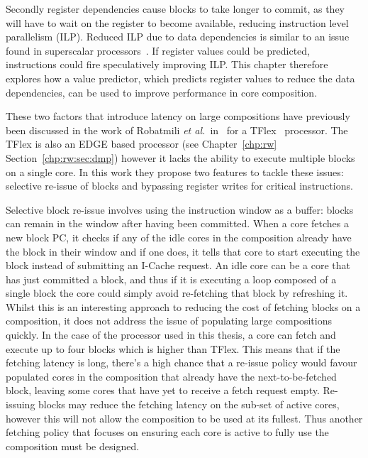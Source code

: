 Secondly register dependencies cause blocks to take longer to commit, as they will have to wait on the register to become available, reducing instruction level parallelism (ILP).
Reduced ILP due to data dependencies is similar to an issue found in superscalar processors~\cite{peraisBeBop2015}.
If register values could be predicted, instructions could fire speculatively improving ILP.
This chapter therefore explores how a value predictor, which predicts register values to reduce the data dependencies, can be used to improve performance in core composition.

These two factors that introduce latency on large compositions have previously been discussed in the work of Robatmili {\it et al.~}in~\cite{robatmili2011uniproc} for a TFlex~\cite{kim2007tflex} processor.
The TFlex is also an EDGE based processor (see Chapter~\ref{chp:rw} Section~\ref{chp:rw:sec:dmp}) however it lacks the ability to execute multiple blocks on a single core.
In this work they propose two features to tackle these issues: selective re-issue of blocks and bypassing register writes for critical instructions.

Selective block re-issue involves using the instruction window as a buffer: blocks can remain in the window after having been committed.
When a core fetches a new block PC, it checks if any of the idle cores in the composition already have the block in their window and if one does, it tells that core to start executing the block instead of submitting an I-Cache request.
An idle core can be a core that has just committed a block, and thus if it is executing a loop composed of a single block the core could simply avoid re-fetching that block by refreshing it.
Whilst this is an interesting approach to reducing the cost of fetching blocks on a composition, it does not address the issue of populating large compositions quickly.
In the case of the processor used in this thesis, a core can fetch and execute up to four blocks which is higher than TFlex.
This means that if the fetching latency is long, there's a high chance that a re-issue policy would favour populated cores in the composition that already have the next-to-be-fetched block, leaving some cores that have yet to receive a fetch request empty.
Re-issuing blocks may reduce the fetching latency on the sub-set of active cores, however this will not allow the composition to be used at its fullest.
Thus another fetching policy that focuses on ensuring each core is active to fully use the composition must be designed.

